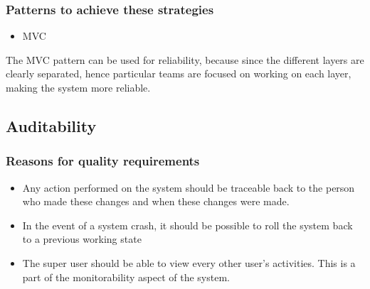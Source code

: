 \documentclass[a4paper,12pt]{article}
\begin{document}
 \subsubsection{Patterns to achieve these strategies}
 \begin{itemize}
 \item MVC
 \end{itemize}
 The MVC pattern can  be used for reliability, because since the different layers are clearly separated, hence particular teams are focused on working on each layer, making the system more reliable. 
 \subsection{Auditability}
 \subsubsection{Reasons for quality requirements}
 \begin{itemize}
 \item Any action performed on the system should be traceable back to the person who made these changes and when these changes were made.
 \item In the event of a system crash, it should be possible to roll the system back to a previous working state
 \item The super user should be able to view every other user's activities. This is a part of the monitorability aspect of the system.
 \end{itemize}
\end{document}
